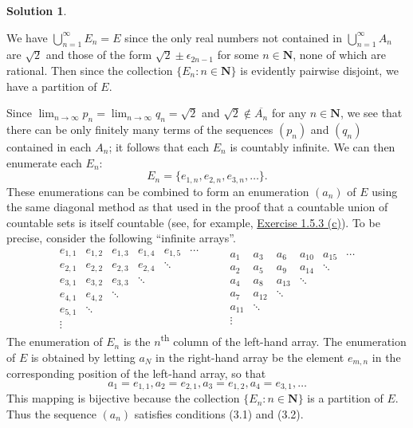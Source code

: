 \documentclass[12pt]{article}
\theoremstyle{definition}
\theoremstyle{exercise}
\theoremstyle{solution}
\newtheorem*{solution}{Solution}
\newcommand{\ts}{\textsuperscript}
\newcommand{\N}{\mathbf{N}}
\begin{document}
\begin{solution}
\begin{enumerate}
        We have \( \bigcup_{n=1}^{\infty} E_n = E \) since the only real numbers not contained in \( \bigcup_{n=1}^{\infty} A_n \) are \( \sqrt{2} \) and those of the form \( \sqrt{2} \pm \epsilon_{2n - 1} \) for some \( n \in \N \), none of which are rational. Then since the collection \( \{ E_n : n \in \N \} \) is evidently pairwise disjoint, we have a partition of \( E \).

        Since \( \lim_{n \to \infty} p_n = \lim_{n \to \infty} q_n = \sqrt{2} \) and \( \sqrt{2} \not\in \overline{A_n} \) for any \( n \in \N \), we see that there can be only finitely many terms of the sequences \( (p_n) \) and \( (q_n) \) contained in each \( A_n \); it follows that each \( E_n \) is countably infinite. We can then enumerate each \( E_n \):
        \[
            E_n = \{ e_{1,n}, e_{2,n}, e_{3,n}, \ldots \}.
        \]
        These enumerations can be combined to form an enumeration \( (a_n) \) of \( E \) using the same diagonal method as that used in the proof that a countable union of countable sets is itself countable (see, for example, \href{https://lew98.github.io/Mathematics/UA_Section_1_5_Exercises.pdf}{Exercise 1.5.3 (c)}). To be precise, consider the following ``infinite arrays''.
        \[
            \begin{matrix}
            e_{1,1} & e_{1,2} & e_{1,3} & e_{1,4} & e_{1,5} & \cdots \\
            e_{2,1} & e_{2,2} & e_{2,3} & e_{2,4} & \ddots &  \\
            e_{3,1} & e_{3,2} & e_{3,3} & \ddots &  &  \\
            e_{4,1} & e_{4,2} & \ddots &   &  &  \\
            e_{5,1} & \ddots &  &  &  &  \\
            \vdots &  &  &  &  & 
            \end{matrix}
            \qquad
            \begin{matrix}
            a_1 & a_3 & a_6 & a_{10} & a_{15} & \cdots \\
            a_2 & a_5 & a_9 & a_{14} & \ddots &  \\
            a_4 & a_8 & a_{13} & \ddots &  &  \\
            a_7 & a_{12} & \ddots &   &  &  \\
            a_{11} & \ddots &  &  &  &  \\
            \vdots &  &  &  &  & 
            \end{matrix}
        \]
        The enumeration of \( E_n \) is the \( n \)\ts{th} column of the left-hand array. The enumeration of \( E \) is obtained by letting \( a_N \) in the right-hand array be the element \( e_{m,n} \) in the corresponding position of the left-hand array, so that
        \[
            a_1 = e_{1,1}, a_2 = e_{2,1}, a_3 = e_{1,2}, a_4 = e_{3,1}, \ldots
        \]
        This mapping is bijective because the collection \( \{ E_n : n \in \N \} \) is a partition of \( E \). Thus the sequence \( (a_n) \) satisfies conditions (3.1) and (3.2).


\end{enumerate}
\end{solution}
\end{document}
